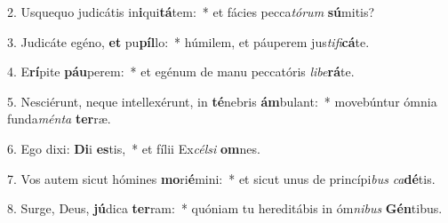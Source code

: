 2. Usquequo judicátis in\textbf{i}qui\textbf{tá}tem:~*  et fácies pecca\textit{tó}\textit{rum} \textbf{sú}mitis?\

3. Judicáte egéno, \textbf{et} pu\textbf{píl}lo:~*  húmilem, et páuperem jus\textit{ti}\textit{fi}\textbf{cá}te.\

4. E\textbf{rí}pite \textbf{páu}perem:~*  et egénum de manu peccatóris \textit{li}\textit{be}\textbf{rá}te.\

5. Nesciérunt, neque intellexérunt, in \textbf{té}nebris \textbf{ám}bulant:~*  movebúntur ómnia funda\textit{mén}\textit{ta} \textbf{ter}ræ.\

6. Ego dixi: \textbf{Di}i \textbf{es}tis,~*  et fílii Ex\textit{cél}\textit{si} \textbf{om}nes.\

7. Vos autem sicut hómines \textbf{mo}ri\textbf{é}mini:~*  et sicut unus de princípi\textit{bus} \textit{ca}\textbf{dé}tis.\

8. Surge, Deus, \textbf{jú}dica \textbf{ter}ram:~*  quóniam tu hereditábis in óm\textit{ni}\textit{bus} \textbf{Gén}tibus.\

